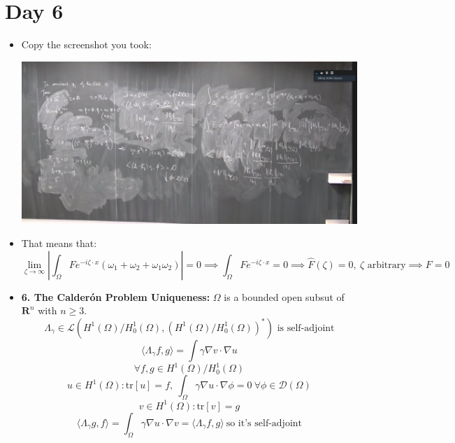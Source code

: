 \documentclass{article}
\begin{document}
\section*{Day 6}
\begin{itemize}
    \item Copy the screenshot you took:
    
    \includegraphics[width=\textwidth]{images/1.png}

    \item That means that:
    \begin{equation}
        \lim_{\zeta \rightarrow \infty} |\int_\Omega F e^{-i\zeta \cdot x} (\omega_1 + \omega_2 + \omega_1\omega_2)| = 0  \implies  \int_\Omega F e^{-i\zeta \cdot x} = 0  \implies  \hat{F}(\zeta) = 0, \ \zeta \text{ arbitrary} \implies F = 0
    \end{equation}

    \item \textbf{6. The Calderón Problem Uniqueness:} $\Omega$ is a bounded open subsut of $\mathbf{R}^n$ with $ n\geq 3$.
    \begin{equation}
        \Lambda_\gamma \in \mathcal{L}(H^1(\Omega)/H^1_0(\Omega), (H^1(\Omega)/H^1_0(\Omega))^*) \text{ is self-adjoint}
    \end{equation}
    \begin{equation}
        \langle \Lambda_\gamma  f, g \rangle = \int \gamma \nabla v \cdot \nabla u
    \end{equation}
    \begin{equation}
        \forall f, g \in H^1(\Omega)/H^1_0(\Omega)
    \end{equation}
    \begin{equation}
        u \in H^1(\Omega): \text{tr} [u] = f, \ \int_\Omega \gamma \nabla u \cdot \nabla \phi = 0 \ \forall \phi \in \mathcal{D}(\Omega)
    \end{equation}
    \begin{equation}
         v \in H^1(\Omega): \text{tr} [v] = g
    \end{equation}
    \begin{equation}
        \langle \Lambda_\gamma  g, f \rangle = \int_\Omega \gamma \nabla u \cdot \nabla v = \langle \Lambda_\gamma  f, g \rangle \ \text{so it's self-adjoint}
    \end{equation}


\end{itemize}
\end{document}
